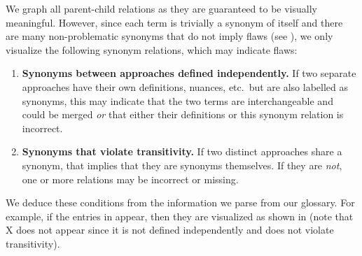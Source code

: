     
    \ExampleParChdGraphs{}

    \clearpage\fi
{}\label{relevantSyns}
We graph all parent-child relations as they are guaranteed to be visually
meaningful.
However, since each term is trivially a synonym of itself and there are many
non-problematic synonyms that do not imply flaws (see ),
we only visualize the following synonym relations, which may indicate flaws:

\begin{enumerate}

    \item%
          \textbf{Synonyms between approaches defined independently.}\hfill\break
          If two separate approaches have their own definitions, nuances,
          etc.~but are also labelled as synonyms, this may indicate that the
          two terms are interchangeable and could be merged \emph{or} that
          either their definitions or this synonym relation is incorrect.

    \item%
          \textbf{Synonyms that violate transitivity.}\hfill\break
          If two distinct approaches share a synonym, that implies that they
          are synonyms themselves. If they are \emph{not}, one or more
          relations may be incorrect or missing.
\end{enumerate}
\ifnotpaper
    We deduce these conditions from the information we parse from our glossary.
    For example, if the entries in  appear, then
    they are visualized as shown in  (note that X
    does not appear since it is not defined independently and does not violate
    transitivity).

